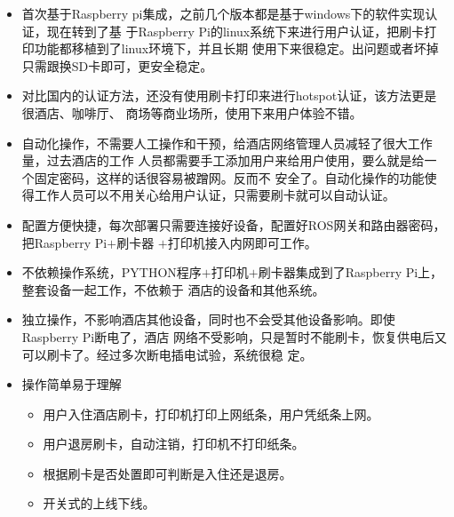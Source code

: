 \begin{itemize}
\item 首次基于Raspberry pi集成，之前几个版本都是基于windows下的软件实现认证，现在转到了基
  于Raspberry Pi的linux系统下来进行用户认证，把刷卡打印功能都移植到了linux环境下，并且长期
  使用下来很稳定。出问题或者坏掉只需跟换SD卡即可，更安全稳定。
\item 对比国内的认证方法，还没有使用刷卡打印来进行hotspot认证，该方法更是很酒店、咖啡厅、
  商场等商业场所，使用下来用户体验不错。
\item 自动化操作，不需要人工操作和干预，给酒店网络管理人员减轻了很大工作量，过去酒店的工作
  人员都需要手工添加用户来给用户使用，要么就是给一个固定密码，这样的话很容易被蹭网。反而不
  安全了。自动化操作的功能使得工作人员可以不用关心给用户认证，只需要刷卡就可以自动认证。
\item 配置方便快捷，每次部署只需要连接好设备，配置好ROS网关和路由器密码，把Raspberry Pi$+$刷卡器
  $+$打印机接入内网即可工作。
\item 不依赖操作系统，PYTHON程序$+$打印机$+$刷卡器集成到了Raspberry Pi上，整套设备一起工作，不依赖于
  酒店的设备和其他系统。
\item 独立操作，不影响酒店其他设备，同时也不会受其他设备影响。即使Raspberry Pi断电了，酒店
  网络不受影响，只是暂时不能刷卡，恢复供电后又可以刷卡了。经过多次断电插电试验，系统很稳
  定。
\item 操作简单易于理解
  \begin{itemize}
  \item 用户入住酒店刷卡，打印机打印上网纸条，用户凭纸条上网。
  \item 用户退房刷卡，自动注销，打印机不打印纸条。
  \item 根据刷卡是否处置即可判断是入住还是退房。
  \item 开关式的上线下线。
  \end{itemize}
\end{itemize}


